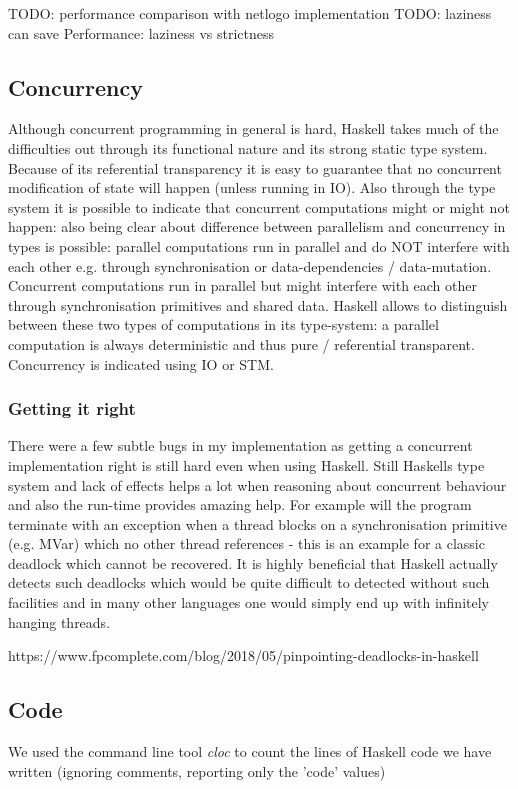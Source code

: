 TODO: performance comparison with netlogo implementation
TODO: laziness can save Performance: laziness vs strictness

\subsection{Concurrency}
Although concurrent programming in general is hard, Haskell takes much of the difficulties out through its functional nature and its strong static type system. Because of its referential transparency it is easy to guarantee that no concurrent modification of state will happen (unless running in IO). Also through the type system it is possible to indicate that concurrent computations might or might not happen: also being clear about difference between parallelism and concurrency in types is possible: parallel computations run in parallel and do NOT interfere with each other e.g. through synchronisation or data-dependencies / data-mutation. Concurrent computations run in parallel but might interfere with each other through synchronisation primitives and shared data. Haskell allows to distinguish between these two types of computations in its type-system: a parallel computation is always deterministic and thus pure / referential transparent. Concurrency is indicated using IO or STM.

\subsubsection{Getting it right}
There were a few subtle bugs in my implementation as getting a concurrent implementation right is still hard even when using Haskell. Still Haskells type system and lack of effects helps a lot when reasoning about concurrent behaviour and also the run-time provides amazing help. For example will the program terminate with an exception when a thread blocks on a synchronisation primitive (e.g. MVar) which no other thread references - this is an example for a classic deadlock which cannot be recovered. It is highly beneficial that Haskell actually detects such deadlocks which would be quite difficult to detected without such facilities and in many other languages one would simply end up with infinitely hanging threads.

https://www.fpcomplete.com/blog/2018/05/pinpointing-deadlocks-in-haskell

\subsection{Code}
We used the command line tool \textit{cloc} to count the lines of Haskell code we have written (ignoring comments, reporting only the 'code' values)

